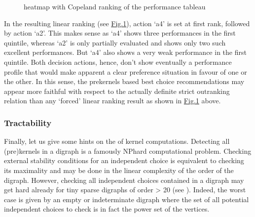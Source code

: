\documentclass[a4paper,12pt,english]{sphinxhowto}
\let\sphinxpxdimen\pdfpxdimen\else\newdimen\sphinxpxdimen
\begin{document}
\begin{figure}[H]
\centering
\capstart

\noindent\sphinxincludegraphics[width=550\sphinxpxdimen]{{outrankingResult}.png}
\caption{heatmap with Copeland ranking of the performance tableau}\label{\detokenize{pearls:outrankingresult}}\end{figure}

\sphinxAtStartPar
In the resulting linear ranking (see \hyperref[\detokenize{pearls:outrankingresult}]{Fig.\@ \ref{\detokenize{pearls:outrankingresult}}}), action ‘a4’ is set at first rank, followed by action ‘a2’. This makes sense as ‘a4’ shows three performances in the first quintile, whereas ‘a2’ is only partially evaluated and shows only two such excellent performances. But ‘a4’ also shows a very weak performance in the first quintile. Both decision actions, hence, don’t show eventually a performance profile that would make apparent a clear preference situation in favour of one or the other. In this sense, the prekernels based best choice recommendations may appear more faithful with respect to the actually definite strict outranking relation than any ‘forced’ linear ranking result as shown in \hyperref[\detokenize{pearls:outrankingresult}]{Fig.\@ \ref{\detokenize{pearls:outrankingresult}}} above.


\subsubsection{Tractability}
\label{\detokenize{pearls:tractability}}
\sphinxAtStartPar
Finally, let us give some hints on the  of kernel computations. Detecting all (pre)kernels in a digraph is a famously NP\sphinxhyphen{}hard computational problem. Checking external stability conditions for an independent choice is equivalent to checking its maximality and may be done in the linear complexity of the order of the digraph. However, checking all independent choices contained in a digraph may get hard already for tiny sparse digraphs of order  \textgreater{} 20 (see ). Indeed, the worst case is given by an empty or indeterminate digraph where the set of all potential independent choices to check is in fact the power set of the vertices.
\end{document}
